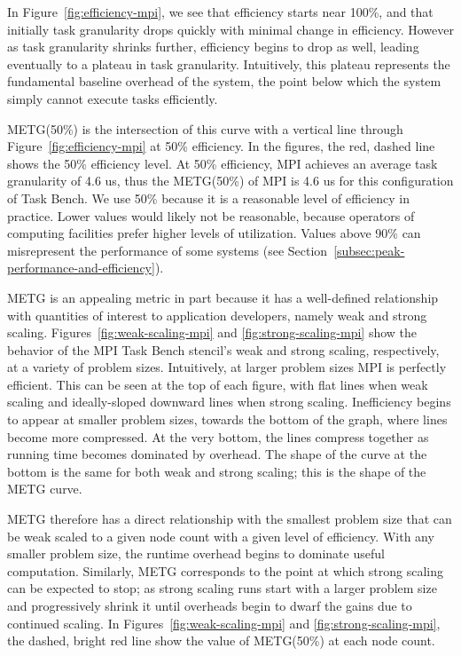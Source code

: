 In Figure~\ref{fig:efficiency-mpi}, we see that
efficiency starts near 100\%, and that initially task granularity
drops quickly with minimal change in efficiency. However as task
granularity shrinks further, efficiency begins to drop as well, leading
eventually to a plateau in task granularity. Intuitively, this plateau
represents the fundamental baseline overhead of the system, the point
below which the system simply cannot execute tasks efficiently.

METG(50\%) is the intersection of this curve with a vertical line through
Figure~\ref{fig:efficiency-mpi} at 50\% efficiency. In the figures, the red, dashed line shows the 50\% efficiency
level. At 50\% efficiency, MPI achieves an average task granularity of
4.6 us, thus the METG(50\%) of MPI is 4.6 us for this configuration of
Task Bench. We use 50\% because it is a reasonable level of
efficiency in practice. Lower values would likely not be reasonable,
because operators of computing facilities prefer higher levels of
utilization. Values above 90\% can misrepresent the performance of
some systems (see
Section~\ref{subsec:peak-performance-and-efficiency}).

METG is an appealing metric in part because it has a well-defined
relationship with quantities of interest to application developers,
namely weak and strong scaling. Figures~\ref{fig:weak-scaling-mpi} and
\ref{fig:strong-scaling-mpi} show the behavior of the MPI Task Bench stencil's weak and strong
scaling, respectively, at a variety of problem sizes. Intuitively, at
larger problem sizes MPI is perfectly efficient. This can be seen at
the top of each figure, with flat lines when weak scaling and
ideally-sloped downward lines when strong scaling. Inefficiency begins
to appear at smaller problem sizes, towards the bottom of the graph,
where lines become more compressed. At the
very bottom, the lines compress together as running time becomes dominated by overhead. The shape of the curve at the bottom is the same
for both weak and strong scaling; this is the shape of
the METG curve.




METG therefore has a direct relationship with the smallest problem
size that can be weak scaled to a given node count with a given level
of efficiency. With any smaller problem size, 
the runtime overhead begins to dominate useful
computation. Similarly, METG corresponds to the point at which strong
scaling can be expected to stop; as strong scaling runs start with a
larger problem size and progressively shrink it until overheads begin
to dwarf the gains due to continued scaling. In
Figures~\ref{fig:weak-scaling-mpi} and \ref{fig:strong-scaling-mpi},
the dashed, bright red line show the value of METG(50\%) at each node
count.

